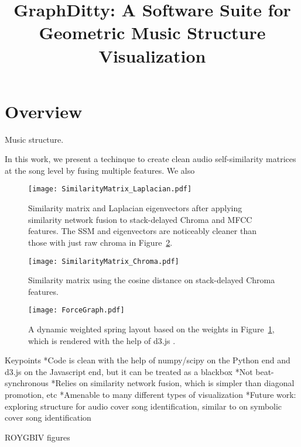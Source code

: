 \documentclass{article}
\title{GraphDitty: A Software Suite for Geometric Music Structure Visualization}
\begin{document}
%
\maketitle
%

\section{Overview}\label{sec:introduction}

Music structure.

In this work, we present a techinque to create clean audio self-similarity matrices at the song level by fusing multiple features.  We also 


\begin{figure}
    \texttt{[image: SimilarityMatrix\_Laplacian.pdf]}
    \caption{Similarity matrix and Laplacian eigenvectors after applying similarity network fusion to stack-delayed Chroma and MFCC features.  The SSM and eigenvectors are noticeably cleaner than those with just raw chroma in Figure~\ref{fig:SSMChroma}.}
    \label{fig:SSMFused}
   \end{figure}

\begin{figure}
    \texttt{[image: SimilarityMatrix\_Chroma.pdf]}
    \caption{Similarity matrix using the cosine distance on stack-delayed Chroma features.}
    \label{fig:SSMChroma}
\end{figure}
   





\begin{figure}
 \texttt{[image: ForceGraph.pdf]}
 \caption{A dynamic weighted spring layout based on the weights in Figure~\ref{fig:SSMFused}, which is rendered with the help of d3.js \cite{bostock2012d3}.}
 \label{fig:example}
\end{figure}

Keypoints
*Code is clean with the help of numpy/scipy on the Python end and d3.js on the Javascript end, but it can be treated as a blackbox
*Not beat-synchronous
*Relies on similarity network fusion, which is simpler than diagonal promotion, etc
*Amenable to many different types of visualization
*Future work: exploring structure for audio cover song identification, similar to \cite{kinnaird2016aligned} on symbolic cover song identification

ROYGBIV figures



\cite{wang2012unsupervised, wang2014similarity,bendichgeometric,coifman2006diffusion,kinnaird2016aligned,mcfee2014analyzing,tralie2017cover,tralie2017Dissertation,bostock2012d3}
\end{document}
